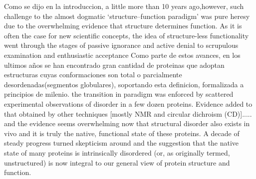 





Como se dijo en la introduccion, a little more than 10 years ago,however, such challenge to the almost dogmatic ‘structure–function paradigm’ was pure heresy due to the overwhelming evidence that structure determines function.
As it is often the case for new scientific concepts, the idea of structure-less functionality went through the stages of passive ignorance and active denial to scrupulous examination and enthusiastic acceptance
Como parte de estos avances, en los ultimos años se han encontrado gran cantidad de proteinas que adoptan estructuras cuyas conformaciones son total o parcialmente desordenadas(segmentos globulares), soportando esta definicion, formalizada a principios de milenio. 
the transition in paradigm was enforced by scattered experimental observations of disorder in a few dozen proteins. 
Evidence added to that obtained by other techniques [mostly NMR and circular dichroism (CD)]..... and the evidence seems overwhelming now that structural disorder also exists in vivo and it is truly the native, functional state of these proteins.
A decade of steady progress turned skepticism around and the suggestion that the native state of many proteins is intrinsically disordered (or, as originally termed, unstructured) is now integral to our general view of protein structure and function.

